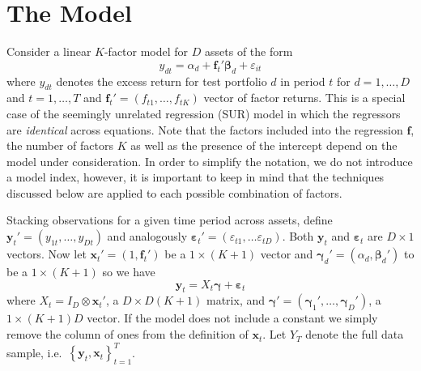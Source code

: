 \section{The Model}
Consider a linear $K$-factor model for $D$ assets of the form
\begin{equation*}
y_{dt}=\alpha _{d} + \mathbf{f}_{t}' \boldsymbol{\beta}_d + \varepsilon_{it}
\end{equation*}
where $y_{dt}$ denotes the excess return for test portfolio $d$ in period $t$ for $d = 1, \hdots, D$ and $t = 1, \hdots, T$ and $\mathbf{f}_{t}'=\left(f_{t1}, \hdots,f_{tK}\right)$ vector of factor returns.
This is a special case of the seemingly unrelated regression (SUR) model in which the regressors are \emph{identical} across equations.
Note that the factors included into the regression $\mathbf{f}$, the number of factors $K$ as well as the presence of the intercept depend on the model under consideration.  
In order to simplify the notation, we do not introduce a model index, however, it is important to keep in mind that the techniques discussed below are applied to each possible combination of factors.

Stacking observations for a given time period across assets, define $\mathbf{y}_t' = (y_{1t}, \hdots, y_{Dt})$ and analogously $\boldsymbol{\varepsilon}_t' = \left( \varepsilon_{t1}, \hdots \varepsilon_{tD} \right)$. 
Both $\mathbf{y}_t$ and $\boldsymbol{\varepsilon}_t$ are $D \times 1$ vectors.
Now let $\mathbf{x}_t' = (1, \mathbf{f}_t')$ be a $1 \times (K+1)$ vector and $\boldsymbol{\gamma}_d' = (\alpha_d, \boldsymbol{\beta}_d')$ to be a $1 \times (K+1)$ so we have
\begin{equation*}
\mathbf{y}_t = X_t \boldsymbol{\gamma} + \boldsymbol{\varepsilon}_t
\end{equation*}
where $X_t = I_D \otimes \mathbf{x}_t'$, a $D \times D(K+1)$ matrix, and $\boldsymbol{\gamma}'= \left( \boldsymbol{\gamma}_1', \hdots, \boldsymbol{\gamma}_D' \right)$, a $1 \times (K+1)D$ vector. 
If the model does not include a constant we simply remove the column of ones from the definition of $\mathbf{x}_t$.
Let $Y_T$ denote the full data sample, i.e.\ $\left\{ \mathbf{y}_t, \mathbf{x}_t \right\}_{t=1}^T$.

